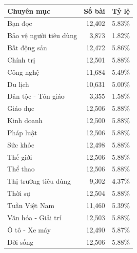 \begin{tabularx}{\textwidth}{Xrr}\toprule
Chuyên mục & Số bài & Tỷ lệ\\\midrule
Bạn đọc & 12,402 & 5.83\%\\
Bảo vệ người tiêu dùng & 3,873 & 1.82\%\\
Bất động sản & 12,472 & 5.86\%\\
Chính trị & 12,501 & 5.88\%\\
Công nghệ & 11,684 & 5.49\%\\
Du lịch & 10,631 & 5.00\%\\
Dân tộc - Tôn giáo & 3,355 & 1.58\%\\
Giáo dục & 12,506 & 5.88\%\\
Kinh doanh & 12,500 & 5.88\%\\
Pháp luật & 12,506 & 5.88\%\\
Sức khỏe & 12,498 & 5.88\%\\
Thế giới & 12,506 & 5.88\%\\
Thể thao & 12,506 & 5.88\%\\
Thị trường tiêu dùng & 9,302 & 4.37\%\\
Thời sự & 12,504 & 5.88\%\\
Tuần Việt Nam & 11,460 & 5.39\%\\
Văn hóa - Giải trí & 12,503 & 5.88\%\\
Ô tô - Xe máy & 12,490 & 5.87\%\\
Đời sống & 12,506 & 5.88\%\\
\bottomrule\end{tabularx}
